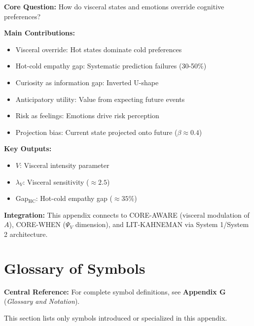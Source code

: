 \begin{tcolorbox}[colback=green!10!white, colframe=green!75!black,
    title=\textbf{Appendix UNMAPPED_LO: Summary}]

\textbf{Core Question:} How do visceral states and emotions override cognitive preferences?

\textbf{Main Contributions:}
\begin{itemize}[nosep]
    \item Visceral override: Hot states dominate cold preferences
    \item Hot-cold empathy gap: Systematic prediction failures (30-50\%)
    \item Curiosity as information gap: Inverted U-shape
    \item Anticipatory utility: Value from expecting future events
    \item Risk as feelings: Emotions drive risk perception
    \item Projection bias: Current state projected onto future ($\beta \approx 0.4$)
\end{itemize}

\textbf{Key Outputs:}
\begin{itemize}[nosep]
    \item $V$: Visceral intensity parameter
    \item $\lambda_V$: Visceral sensitivity ($\approx 2.5$)
    \item Gap$_{\text{HC}}$: Hot-cold empathy gap ($\approx 35\%$)
\end{itemize}

\textbf{Integration:} This appendix connects to CORE-AWARE (visceral modulation of $A$),
CORE-WHEN ($\Psi_V$ dimension), and LIT-KAHNEMAN via System 1/System 2 architecture.

\end{tcolorbox}


\section{Glossary of Symbols}
\label{sec:lo-glossary}

\begin{tcolorbox}[colback=blue!5!white, colframe=blue!75!black]
\textbf{Central Reference:} For complete symbol definitions, see
\textbf{Appendix G} (\textit{Glossary and Notation}).

This section lists only symbols introduced or specialized in this appendix.
\end{tcolorbox}

